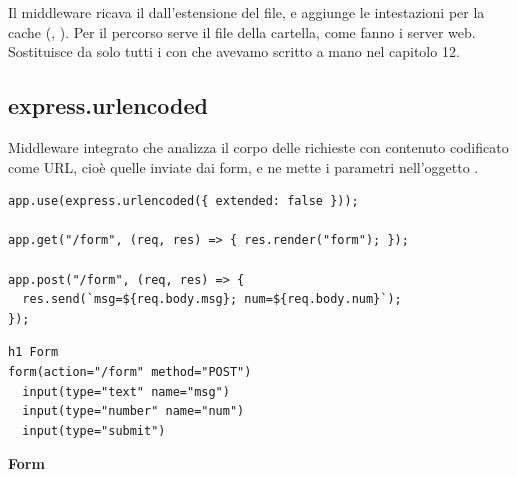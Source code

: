 
Il middleware ricava il  dall'estensione del file, e aggiunge
le intestazioni per la cache (, ). Per il
percorso \code{/} serve il file  della cartella, come fanno i
server web. Sostituisce da solo tutti i  con  che
avevamo scritto a mano nel capitolo 12.

\subsection{express.urlencoded}

Middleware integrato che analizza il corpo delle richieste con contenuto
codificato come URL, cioè quelle inviate dai form, e ne mette i parametri
nell'oggetto .

\begin{affianco}[0.55]
\begin{lstlisting}[style=js]
app.use(express.urlencoded({ extended: false }));

app.get("/form", (req, res) => { res.render("form"); });

app.post("/form", (req, res) => {
  res.send(`msg=${req.body.msg}; num=${req.body.num}`);
});
\end{lstlisting}
\risultato
\begin{lstlisting}[style=pug, name=views/form.pug]
h1 Form
form(action="/form" method="POST")
  input(type="text" name="msg")
  input(type="number" name="num")
  input(type="submit")
\end{lstlisting}
\begin{browser}
  {\Lora\bfseries\LARGE Form}\\[4pt]
  \ \ 
\end{browser}
\end{affianco}

